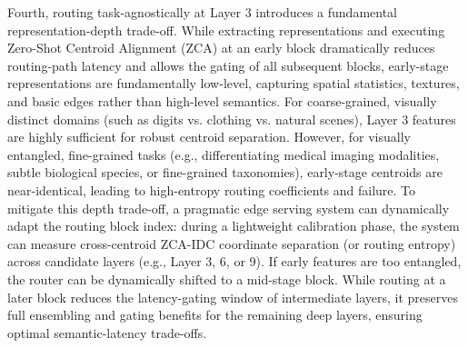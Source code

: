 Fourth, routing task-agnostically at Layer 3 introduces a fundamental representation-depth trade-off. While extracting representations and executing Zero-Shot Centroid Alignment (ZCA) at an early block dramatically reduces routing-path latency and allows the gating of all subsequent blocks, early-stage representations are fundamentally low-level, capturing spatial statistics, textures, and basic edges rather than high-level semantics. For coarse-grained, visually distinct domains (such as digits vs. clothing vs. natural scenes), Layer 3 features are highly sufficient for robust centroid separation. However, for visually entangled, fine-grained tasks (e.g., differentiating medical imaging modalities, subtle biological species, or fine-grained taxonomies), early-stage centroids are near-identical, leading to high-entropy routing coefficients and failure. To mitigate this depth trade-off, a pragmatic edge serving system can dynamically adapt the routing block index: during a lightweight calibration phase, the system can measure cross-centroid ZCA-IDC coordinate separation (or routing entropy) across candidate layers (e.g., Layer 3, 6, or 9). If early features are too entangled, the router can be dynamically shifted to a mid-stage block. While routing at a later block reduces the latency-gating window of intermediate layers, it preserves full ensembling and gating benefits for the remaining deep layers, ensuring optimal semantic-latency trade-offs.

